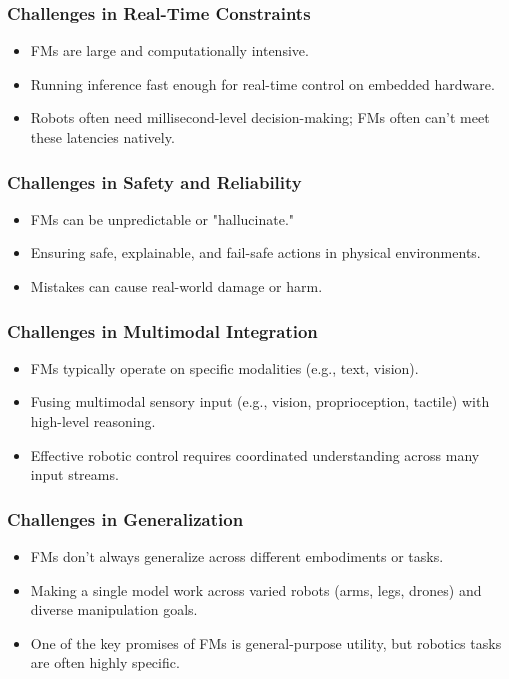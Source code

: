\documentclass[10pt]{article}
\begin{document}
\subsubsection*{Challenges in Real-Time Constraints}
\begin{itemize}
	\item FMs are large and computationally intensive.
	\item Running inference fast enough for real-time control on embedded hardware.
	\item Robots often need millisecond-level decision-making; FMs often can't meet these latencies natively.
\end{itemize}

\subsubsection*{Challenges in Safety and Reliability}
\begin{itemize}
	\item FMs can be unpredictable or "hallucinate."
	\item Ensuring safe, explainable, and fail-safe actions in physical environments.
	\item Mistakes can cause real-world damage or harm.
\end{itemize}

\subsubsection*{Challenges in Multimodal Integration}
\begin{itemize}
	\item FMs typically operate on specific modalities (e.g., text, vision).
	\item Fusing multimodal sensory input (e.g., vision, proprioception, tactile) with high-level reasoning.
	\item Effective robotic control requires coordinated understanding across many input streams.
\end{itemize}

\subsubsection*{Challenges in Generalization}
\begin{itemize}
	\item FMs don't always generalize across different embodiments or tasks.
	\item Making a single model work across varied robots (arms, legs, drones) and diverse manipulation goals.
	\item One of the key promises of FMs is general-purpose utility, but robotics tasks are often highly specific.
\end{itemize}
\end{document}
